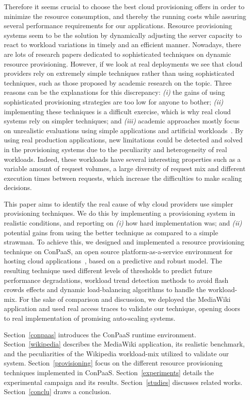 Therefore it seems crucial to choose the best cloud provisioning offers in order to minimize the resource consumption, and thereby the running costs while assuring several performance requirements for our applications. Resource provisioning systems seem to be the solution by dynamically adjusting the server capacity to react to workload variations in timely and an efficient manner. Nowadays, there are lots of research papers dedicated to sophisticated techniques on dynamic resource provisioning. However, if we look at real deployments we see that cloud providers rely on extremely simple techniques rather than using sophisticated techniques, such as those proposed by academic research on the topic. Three reasons can be the explanations for this discrepancy: \emph{(i)} the gains of using sophisticated provisioning strategies are too low for anyone to bother; \emph{(ii)}  implementing these techniques is a difficult exercise, which is why real cloud systems rely on simpler techniques; and \emph{(iii)} academic approaches mostly focus on unrealistic evaluations using simple applications and artificial workloads~\cite{do_profiling_2011, islam_empirical_2012, wang_appraise:_2009}. By using real production applications, new limitations could be detected and solved in the provisioning systems due to the peculiarity and heterogeneity of real workloads. Indeed, these workloads have several interesting properties such as a variable amount of request volumes, a large diversity of request mix and different execution times between requests, which increase the difficulties to make scaling decisions.


This paper aims to identify the real cause of why cloud providers use simpler provisioning techniques. We do this by implementing a provisioning system in realistic conditions, and reporting on \emph{(i)} how hard implementation was; and \emph{(ii)} potential gains from using the better technique as compared to a simple strawman. To achieve this, we designed and implemented a resource provisioning technique on ConPaaS, an open source platform-as-a-service environment for hosting cloud applications~\cite{conpaasIC}, based on a predictive and robust model. The resulting technique used different levels of thresholds to predict future performance degradations, workload trend detection methods to avoid flash crowds effects and dynamic load-balancing algorithms to handle the workload-mix. For the sake of comparison and discussion, we deployed the MediaWiki application and used real access traces to validate our technique, opening doors to real implementation of promising auto-scaling systems.


Section~\ref{conpaas} introduces the ConPaaS runtime environment. Section~\ref{wikipedia} describes the MediaWiki application, its realistic benchmark, and the peculiarities of the Wikipedia workload-mix utilized to validate our system. Section~\ref{provisioning} focus on the different resource provisioning techniques implemented in ConPaaS. Section~\ref{experiments} details the experimental campaign and its results. Section~\ref{studies} discusses related works. Section~\ref{conclu} draws a conclusion.

